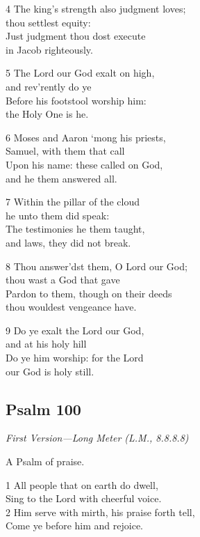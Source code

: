 4 The king’s strength also judgment loves;\\
thou settlest equity:\\
Just judgment thou dost execute\\
in Jacob righteously.

5 The Lord our God exalt on high,\\
and rev’rently do ye\\
Before his footstool worship him:\\
the Holy One is he.

6 Moses and Aaron ‘mong his priests,\\
Samuel, with them that call\\
Upon his name: these called on God,\\
and he them answered all.

7 Within the pillar of the cloud\\
he unto them did speak:\\
The testimonies he them taught,\\
and laws, they did not break.

8 Thou answer’dst them, O Lord our God;\\
thou wast a God that gave\\
Pardon to them, though on their deeds\\
thou wouldest vengeance have.

9 Do ye exalt the Lord our God,\\
and at his holy hill\\
Do ye him worship: for the Lord\\
our God is holy still.

\begin{center}
\quad{}\quad{}
\end{center}

\subsection*{Psalm 100}

\emph{First Version---Long Meter (L.M., 8.8.8.8)}

A Psalm of praise.

1 All people that on earth do dwell,\\
Sing to the Lord with cheerful voice.\\
2 Him serve with mirth, his praise forth tell,\\
Come ye before him and rejoice.

